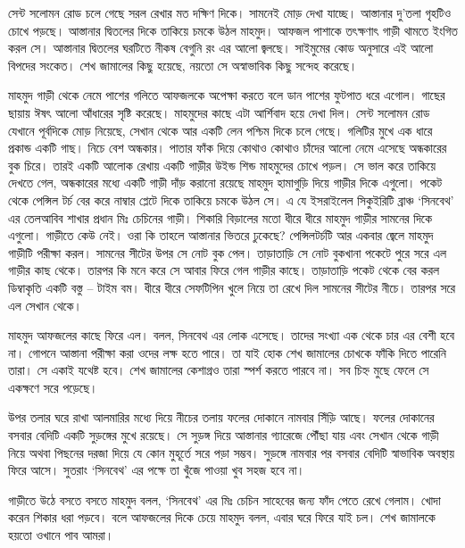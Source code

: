 \documentclass[
]{book}
\begin{document}
সেন্ট সলোমন রোড চলে গেছে সরল রেখার মত দক্ষিণ দিকে। সামনেই মোড় দেখা যাচ্ছে। আস্তানার দু'তলা গৃহটিও চোখে পড়ছে। আস্তানার দ্বিতলের দিকে তাকিয়ে চমকে উঠল মাহমুদ। আফজল পাশাকে তৎক্ষণাৎ গাড়ী থামতে ইংগিত করল সে। আস্তানার দ্বিতলের ঘরটিতে নীকষ বেগুনি রং এর আলো জ্বলছে। সাইমুমের কোড অনুসারে এই আলো বিপদের সংকেত। শেখ জামালের কিছু হয়েছে, নয়তো সে অস্বাভাবিক কিছু সন্দেহ করেছে।

মাহমুদ গাড়ী থেকে নেমে পাশের গলিতে আফজলকে অপেক্ষা করতে বলে ডান পাশের ফুটপাত ধরে এগোল। গাছের ছায়ায় ঈষৎ আলো আঁধারের সৃষ্টি করেছে। মাহমুদের কাছে এটা আর্শিবাদ হয়ে দেখা দিল। সেন্ট সলোমন রোড যেখানে পূর্বদিকে মোড় নিয়েছে, সেখান থেকে আর একটি লেন পশ্চিম দিকে চলে গেছে। গলিটির মুখে এক ধারে প্রকান্ড একটি গাছ। নিচে বেশ অন্ধকার। পাতার ফাঁক দিয়ে কোথাও কোথাও চাঁদের আলো নেমে এসেছে অন্ধকারের বুক চিরে। তারই একটি আলোক রেখায় একটি গাড়ীর উইন্ড শিন্ড মাহমুদের চোখে পড়ল। সে ভাল করে তাকিয়ে দেখতে গেল, অন্ধকারের মধ্যে একটি গাড়ী দাঁড় করানো রয়েছে মাহমুদ হামাগুড়ি দিয়ে গাড়ীর দিকে এগুলো। পকেট থেকে পেন্সিল টর্চ বের করে নাম্বার প্লেটে দিকে তাকিয়ে চমকে উঠল সে। এ যে ইসরাইলেল সিকুইরিটি ব্রাঞ্চ `সিনবেথ' এর তেলআবিব শাখার প্রধান মিঃ চেচিনের গাড়ী। শিকারি বিড়ালের মতো ধীরে ধীরে মাহমুদ গাড়ীর সামনের দিকে এগুলো। গাড়ীতে কেউ নেই। ওরা কি তাহলে আস্তানার ভিতরে ঢুকেছে? পেন্সিলটর্চটি আর একবার জ্বেলে মাহমুদ গাড়ীটি পরীক্ষা করল। সামনের সীটের উপর সে নোট বুক পেল। তাড়াতাড়ি সে নোট বুকখানা পকেটে পুরে সরে এল গাড়ীর কাছ থেকে। তারপর কি মনে করে সে আবার ফিরে গেল গাড়ীর কাছে। তাড়াতাড়ি পকেট থেকে বের করল ডিম্বাকৃতি একটি বস্তু -- টাইম বম। ধীরে ধীরে সেফটিপিন খুলে নিয়ে তা রেখে দিল সামনের সীটের নীচে। তারপর সরে এল সেখান থেকে।

মাহমুদ আফজলের কাছে ফিরে এল। বলল, সিনবেথ এর লোক এসেছে। তাদের সংখ্যা এক থেকে চার এর বেশী হবে না। গোপনে আস্তানা পরীক্ষা করা ওদের লক্ষ হতে পারে। তা যাই হোক শেখ জামালের চোখকে ফাঁকি দিতে পারেনি তারা। সে একাই যথেষ্ট হবে। শেখ জামালের কেশাগ্রও তারা স্পর্শ করতে পারবে না। সব চিহ্ন মুছে ফেলে সে একক্ষণে সরে পড়েছে।

উপর তলার ঘরে রাখা আলমারির মধ্যে দিয়ে নীচের তলায় ফলের দোকানে নামবার সিঁড়ি আছে। ফলের দোকানের বসবার বেদিটি একটি সুড়ঙ্গের মুখে রয়েছে। সে সুড়ঙ্গ দিয়ে আস্তানার গ্যারেজে পৌঁছা যায় এবং সেখান থেকে গাড়ী নিয়ে অথবা পিছনের দরজা দিয়ে যে কোন মুহূর্তে সরে পড়া সম্ভব। সুড়ঙ্গে নামবার পর বসবার বেদিটি স্বাভাবিক অবস্থায় ফিরে আসে। সুতরাং `সিনবেথ' এর পক্ষে তা খুঁজে পাওয়া খুব সহজ হবে না।

গাড়ীতে উঠে বসতে বসতে মাহমুদ বলল, `সিনবেথ' এর মিঃ চেচিন সাহেবের জন্য ফাঁদ পেতে রেখে গেলাম। খোদা করেন শিকার ধরা পড়বে। বলে আফজলের দিকে চেয়ে মাহমুদ বলল, এবার ঘরে ফিরে যাই চল। শেখ জামালকে হয়তো ওখানে পাব আমরা।
\end{document}
